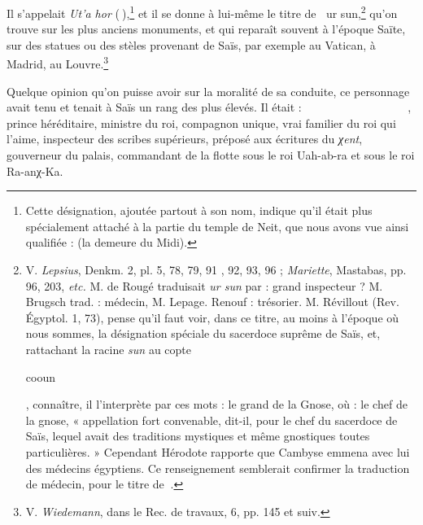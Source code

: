 \documentclass[a4paper, 11pt, oneside]{article}
\newcommand*\hieroAAAX{}
\newcommand*\hieroAABR{}
\newcommand*\hieroAACS{}
\newcommand*\hieroAAHO{}
\newcommand*\hieroAAID{}
\newcommand*\hieroAAJC{}
\newcommand*\hieroAAJW{}
\newcommand*\hieroAALJ{}
\newcommand*\hieroAAOH{\raisebox{0.3ex}{}}
\newcommand*\hieroAAOR{}
\newcommand*\hieroAAOX{}
\newcommand*\hieroAAPI{}
\newcommand*\hieroAAQI{}
\newcommand*\hieroAARO{}
\newcommand*\hieroAATA{}
\newcommand*\hieroAAVA{}
\newcommand*\hieroAAWZ{}
\newcommand*\hieroABAW{}
\newcommand*\hieroABAX{}
\newcommand*\hieroABAY{}
\newcommand*\hieroABAZ{\raisebox{0.5ex}{}}
\newcommand*\hieroABBA{}
\newcommand*\hieroABBB{}
\newcommand*\hieroABBC{}
\newcommand*\hieroABBD{}
\newcommand*\hieroABBE{}
\newcommand*\hieroABBF{}
\newcommand*\hieroABBG{}
\newcommand*\hieroABBH{}
\newcommand*\hieroABBI{}
\newcommand*\hieroABBJ{}
\begin{document}
Il s'appelait \emph{Ut'a hor} ($\hieroAAAX\:\hieroAAID$),\footnote{Cette désignation, ajoutée partout à son nom, indique qu'il était plus spécialement attaché à la partie du temple de Neit, que nous avons vue ainsi qualifiée : (la demeure du Midi).} et il se donne à lui-même le titre de $\hieroAAOX\:\hieroABAW$ ur sun,\footnote{V. \emph{Lepsius}, Denkm. 2, pl. 5, 78, 79, 91 , 92, 93, 96 ; \emph{Mariette}, Mastabas, pp. 96, 203, \emph{etc.} M. de Rougé traduisait \emph{ur sun} par : grand inspecteur ? M. Brugsch trad. : médecin, M. Lepage. Renouf : trésorier. M. Révillout (Rev. Égyptol. 1, 73), pense qu'il faut voir, dans ce titre, au moins à l'époque où nous sommes, la désignation spéciale du sacerdoce suprême de Saïs, et, rattachant la racine \emph{sun} au copte \begin{coptic}cooun\end{coptic}, connaître, il l'interprète par ces mots : le grand de la Gnose, où : le chef de la gnose, « appellation fort convenable, dit-il, pour le chef du sacerdoce de Saïs, lequel avait des traditions mystiques et même gnostiques toutes particulières. » Cependant Hérodote rapporte que Cambyse emmena avec lui des médecins égyptiens. Ce renseignement semblerait confirmer la traduction de médecin, pour le titre de $\hieroAAOX\:\hieroABAX$.} qu'on trouve sur les plus anciens monuments, et qui reparaît souvent à l'époque Saïte, sur des statues ou des stèles provenant de Saïs, par exemple au Vatican, à Madrid, au Louvre.\footnote{V. \emph{Wiedemann}, dans le Rec. de travaux, 6, pp. 145 et suiv.}

Quelque opinion qu'on puisse avoir sur la moralité de sa conduite, ce personnage avait tenu et tenait à Saïs un rang des plus élevés. Il était : $\hieroABAY\:\hieroAAJW\:\hieroAAJC\allowbreak\:\hieroABAZ\:\hieroAACS\:\hieroAATA\allowbreak\:\hieroABBA\:\hieroAAAX\:\hieroAARO\allowbreak\:\hieroABBB\:\hieroABBC\:\hieroAAPI\allowbreak\:\hieroAACS\:\hieroAAQI\:\hieroAAPI\allowbreak\:\hieroAABR\:\hieroABBD\:\hieroABBD\allowbreak\:\hieroAAWZ\:\hieroAAVA\:\hieroAAPI\allowbreak\:\hieroAAHO\:\hieroAAOX\allowbreak\:\hieroAAOR\:\hieroABBE\:\hieroAAVA\allowbreak\:\hieroAAAX\:\hieroAAOH\:\hieroABBF\allowbreak\:\hieroABBG\:\hieroAALJ\:\hieroABBH\allowbreak\:\hieroABBI\:\hieroAAVA\allowbreak\:\hieroAAAX\:\hieroAAOH\:\hieroABBF\allowbreak\:\hieroABBG\:\hieroAALJ\allowbreak\:\hieroABBH\:\hieroABBJ$, prince héréditaire, ministre du roi, compagnon unique, vrai familier du roi qui l'aime, inspecteur des scribes supérieurs, préposé aux écritures du \emph{χent}, gouverneur du palais, commandant de la flotte sous le roi Uah-ab-ra et sous le roi Ra-anχ-Ka.
\end{document}
